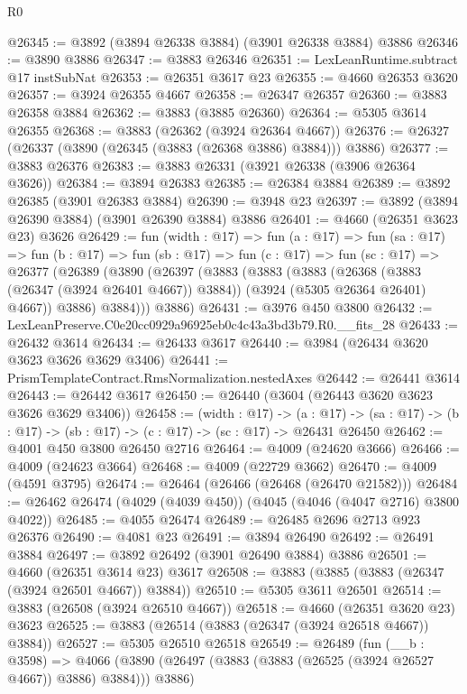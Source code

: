 \begin{lexlean}{R0}
\begin{coremodule}
@26345 := @3892 (@3894 @26338 @3884) (@3901 @26338 @3884) @3886
@26346 := @3890 @3886
@26347 := @3883 @26346
@26351 := LexLeanRuntime.subtract @17 instSubNat
@26353 := @26351 @3617 @23
@26355 := @4660 @26353 @3620
@26357 := @3924 @26355 @4667
@26358 := @26347 @26357
@26360 := @3883 @26358 @3884
@26362 := @3883 (@3885 @26360)
@26364 := @5305 @3614 @26355
@26368 := @3883 (@26362 (@3924 @26364 @4667))
@26376 := @26327 (@26337 (@3890 (@26345 (@3883 (@26368 @3886) @3884))) @3886)
@26377 := @3883 @26376
@26383 := @3883 @26331 (@3921 @26338 (@3906 @26364 @3626))
@26384 := @3894 @26383
@26385 := @26384 @3884
@26389 := @3892 @26385 (@3901 @26383 @3884)
@26390 := @3948 @23
@26397 := @3892 (@3894 @26390 @3884) (@3901 @26390 @3884) @3886
@26401 := @4660 (@26351 @3623 @23) @3626
@26429 := fun (width : @17) =>
  fun (a : @17) =>
  fun (sa : @17) =>
  fun (b : @17) =>
  fun (sb : @17) =>
  fun (c : @17) =>
  fun (sc : @17) =>
  @26377
    (@26389
      (@3890
        (@26397
          (@3883
            (@3883
              (@3883
                (@26368 (@3883 (@26347 (@3924 @26401 @4667)) @3884))
                (@3924 (@5305 @26364 @26401) @4667))
              @3886)
            @3884)))
      @3886)
@26431 := @3976 @450 @3800
@26432 := LexLeanPreserve.C0e20cc0929a96925eb0c4c43a3bd3b79.R0.__fits_28
@26433 := @26432 @3614
@26434 := @26433 @3617
@26440 := @3984 (@26434 @3620 @3623 @3626 @3629 @3406)
@26441 := PrismTemplateContract.RmsNormalization.nestedAxes
@26442 := @26441 @3614
@26443 := @26442 @3617
@26450 := @26440 (@3604 (@26443 @3620 @3623 @3626 @3629 @3406))
@26458 := (width : @17) ->
  (a : @17) -> (sa : @17) -> (b : @17) -> (sb : @17) -> (c : @17) -> (sc : @17) -> @26431 @26450
@26462 := @4001 @450 @3800 @26450 @2716
@26464 := @4009 (@24620 @3666)
@26466 := @4009 (@24623 @3664)
@26468 := @4009 (@22729 @3662)
@26470 := @4009 (@4591 @3795)
@26474 := @26464 (@26466 (@26468 (@26470 @21582)))
@26484 := @26462 @26474 (@4029 (@4039 @450)) (@4045 (@4046 (@4047 @2716) @3800 @4022))
@26485 := @4055 @26474
@26489 := @26485 @2696 @2713 @923 @26376
@26490 := @4081 @23
@26491 := @3894 @26490
@26492 := @26491 @3884
@26497 := @3892 @26492 (@3901 @26490 @3884) @3886
@26501 := @4660 (@26351 @3614 @23) @3617
@26508 := @3883 (@3885 (@3883 (@26347 (@3924 @26501 @4667)) @3884))
@26510 := @5305 @3611 @26501
@26514 := @3883 (@26508 (@3924 @26510 @4667))
@26518 := @4660 (@26351 @3620 @23) @3623
@26525 := @3883 (@26514 (@3883 (@26347 (@3924 @26518 @4667)) @3884))
@26527 := @5305 @26510 @26518
@26549 := @26489
    (fun (__b : @3598) =>
    @4066 (@3890 (@26497 (@3883 (@3883 (@26525 (@3924 @26527 @4667)) @3886) @3884))) @3886)

\end{coremodule}
\end{lexlean}
